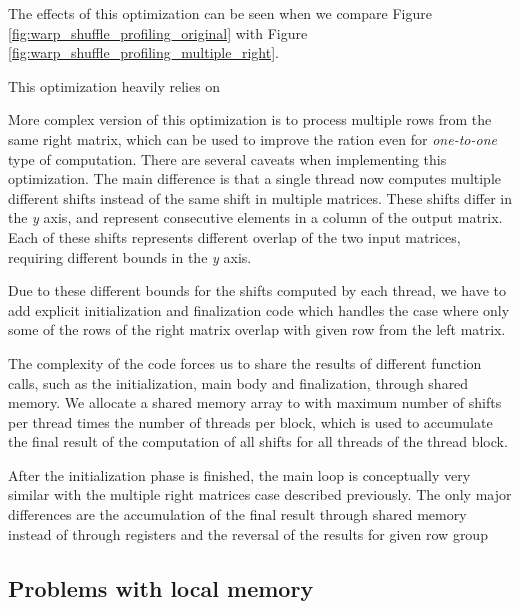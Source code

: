 The effects of this optimization can be seen when we compare Figure \ref{fig:warp_shuffle_profiling_original} with Figure \ref{fig:warp_shuffle_profiling_multiple_right}. %

This optimization heavily relies on


More complex version of this optimization is to process multiple rows from the same right matrix, which can be used to improve the ration even for \textit{one-to-one} type of computation. There are several caveats when implementing this optimization. The main difference is that a single thread now computes multiple different shifts instead of the same shift in multiple matrices. These shifts differ in the \textit{y} axis, and represent consecutive elements in a column of the output matrix. Each of these shifts represents different overlap of the two input matrices, requiring different bounds in the \textit{y} axis. %

Due to these different bounds for the shifts computed by each thread, we have to add explicit initialization and finalization code which handles the case where only some of the rows of the right matrix overlap with given row from the left matrix. %


The complexity of the code forces us to share the results of different function calls, such as the initialization, main body and finalization, through shared memory. We allocate a shared memory array to with maximum number of shifts per thread times the number of threads per block, which is used to accumulate the final result of the computation of all shifts for all threads of the thread block. %

After the initialization phase is finished, the main loop is conceptually very similar with the multiple right matrices case described previously. The only major differences are the accumulation of the final result through shared memory instead of through registers and the reversal of the results for given row group   %



\subsection{Problems with local memory}

